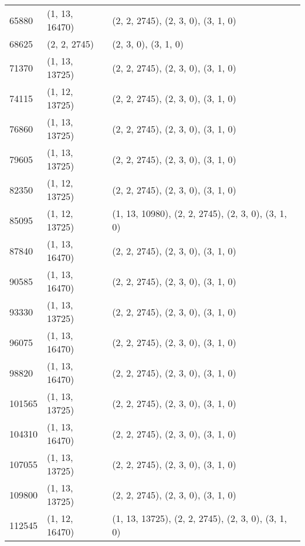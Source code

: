 \begin{longtable}{@{\extracolsep{\fill}}lll}
  65880              & (1, 13, 16470)              & (2, 2, 2745), (2, 3, 0), (3, 1, 0)                  \\
  68625              & (2, 2, 2745)                & (2, 3, 0), (3, 1, 0)                                \\
  71370              & (1, 13, 13725)              & (2, 2, 2745), (2, 3, 0), (3, 1, 0)                  \\
  74115              & (1, 12, 13725)              & (2, 2, 2745), (2, 3, 0), (3, 1, 0)                  \\
  76860              & (1, 13, 13725)              & (2, 2, 2745), (2, 3, 0), (3, 1, 0)                  \\
  79605              & (1, 13, 13725)              & (2, 2, 2745), (2, 3, 0), (3, 1, 0)                  \\
  82350              & (1, 12, 13725)              & (2, 2, 2745), (2, 3, 0), (3, 1, 0)                  \\
  85095              & (1, 12, 13725)              & (1, 13, 10980), (2, 2, 2745), (2, 3, 0), (3, 1, 0)  \\
  87840              & (1, 13, 16470)              & (2, 2, 2745), (2, 3, 0), (3, 1, 0)                  \\
  90585              & (1, 13, 16470)              & (2, 2, 2745), (2, 3, 0), (3, 1, 0)                  \\
  93330              & (1, 13, 13725)              & (2, 2, 2745), (2, 3, 0), (3, 1, 0)                  \\
  96075              & (1, 13, 16470)              & (2, 2, 2745), (2, 3, 0), (3, 1, 0)                  \\
  98820              & (1, 13, 16470)              & (2, 2, 2745), (2, 3, 0), (3, 1, 0)                  \\
  101565             & (1, 13, 13725)              & (2, 2, 2745), (2, 3, 0), (3, 1, 0)                  \\
  104310             & (1, 13, 16470)              & (2, 2, 2745), (2, 3, 0), (3, 1, 0)                  \\
  107055             & (1, 13, 13725)              & (2, 2, 2745), (2, 3, 0), (3, 1, 0)                  \\
  109800             & (1, 13, 13725)              & (2, 2, 2745), (2, 3, 0), (3, 1, 0)                  \\
  112545             & (1, 12, 16470)              & (1, 13, 13725), (2, 2, 2745), (2, 3, 0), (3, 1, 0)  \\

\end{longtable}

